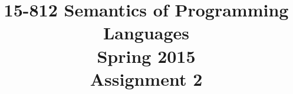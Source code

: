 \documentclass{article}
\begin{document}
\newcommand{\E}{\mathtt{e}}
\newcommand{\B}{\mathtt{b}}
\newcommand{\C}{\mathtt{c}}
\newcommand{\R}{\mathtt{R}}
\newcommand{\LL}{\mathtt{L}}
\newcommand{\Sem}{\mathtt{S}}
\newcommand{\true}{\mathtt{true}}
\newcommand{\false}{\mathtt{false}}
\newcommand{\andsym}{\mathtt{and}}
\newcommand{\orsym}{\mathtt{or}}
\newcommand{\notsym}{\mathop{\mathtt{not}}}
\newcommand{\ifsym}{\mathtt{if}}
\newcommand{\then}{\mathtt{then}}
\newcommand{\elsesym}{\mathtt{else}}
\newcommand{\whilesym}{\mathtt{while}}
\newcommand{\dosym}{\mathtt{do}}
\newcommand{\skipsym}{\mathtt{skip}}
\newcommand{\nil}{\mathtt{nil}}
\newcommand{\case}{\mathtt{case}}
\newcommand{\digit}{\mathtt{d}}
\newcommand{\negation}{\mathtt{neg}}
\newcommand{\Digit}{\mathbf{Digit}}
\newcommand{\denot}[1]{\mathtt{[[{#1}]]}}

\newtheorem{theorem}{Theorem}						
\newtheorem{definition}[theorem]{Definition}
\newtheorem{proposition}[theorem]{Proposition}
\newtheorem{lemma}[theorem]{Lemma}
\newtheorem{axiom}{Axiom}
\newtheorem{notation}[theorem]{Notation}
\newtheorem{corollary}[theorem]{Corollary}

\title{\textbf{15-812 Semantics of Programming Languages \\ Spring 2015 \\ {\large Assignment 2}}}
\date{}
\author{}

\maketitle
\end{document}
